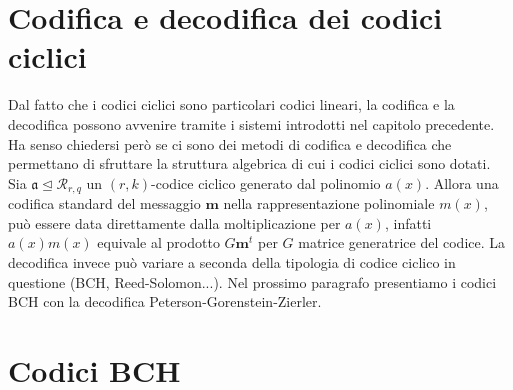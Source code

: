 
\section{Codifica e decodifica dei codici ciclici}

Dal fatto che i codici ciclici sono particolari codici lineari, la codifica e la decodifica possono avvenire tramite i sistemi introdotti nel capitolo precedente. Ha senso chiedersi però se ci sono dei metodi di codifica e decodifica che permettano di sfruttare la struttura algebrica di cui i codici ciclici sono dotati.\\
Sia $\mathfrak{a} \trianglelefteq \mathcal{R}_{r,q}$ un $(r,k)$-codice ciclico generato dal polinomio $a(x)$. Allora una codifica standard del messaggio $\mathbf{m}$ nella rappresentazione polinomiale $m(x)$, può essere data direttamente dalla moltiplicazione per $a(x)$, infatti $a(x)m(x)$ equivale al prodotto $G\mathbf{m}^{t}$ per $G$ matrice generatrice del codice. La decodifica invece può variare a seconda della tipologia di codice ciclico in questione (BCH, Reed-Solomon...). Nel prossimo paragrafo presentiamo i codici BCH con la decodifica Peterson-Gorenstein-Zierler.


\section{Codici BCH}


